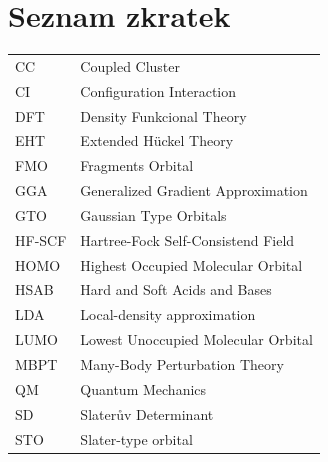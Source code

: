 \documentclass[
  printed, %
  table,   %
  lof,     %
  lot,     %
  oneside,
]{fithesis3}
\begin{document}
\chapter*{Seznam zkratek}
\begin{table}[htbp]
\begin{tabular}{l l}
CC & Coupled Cluster \\ 
CI & Configuration Interaction \\ 
DFT & Density Funkcional Theory \\
EHT & Extended Hückel Theory \\ 
FMO & Fragments Orbital \\ 
GGA &  Generalized Gradient Approximation \\ 
GTO & Gaussian Type Orbitals \\ 
HF-SCF & Hartree-Fock Self-Consistend Field \\ 
HOMO  & Highest Occupied Molecular Orbital \\ 
HSAB & Hard and Soft Acids and Bases \\ 
LDA & Local-density approximation \\ 
LUMO & Lowest Unoccupied Molecular Orbital \\ 
MBPT &  Many-Body Perturbation Theory \\ 
QM & Quantum Mechanics \\ 
SD & Slaterův Determinant \\ 
STO & Slater-type orbital  \\ 
\end{tabular}
\end{table}

\end{document}
